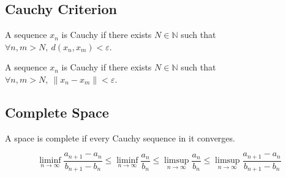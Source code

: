 \subsection{Cauchy Criterion}
\begin{definition}[metric]
	A sequence $x_n$ is Cauchy if there exists $N \in \mathbb{N}$ such that $\forall n,m > N,\ d(x_n,x_m) < \varepsilon$.
\end{definition}

\begin{definition}[norm]
	A sequence $x_n$ is Cauchy if there exists $N \in \mathbb{N}$ such that $\forall n,m >N,\ \|x_n-x_m\| < \varepsilon$.
\end{definition}

\subsection{Complete Space}
\begin{definition}[complete]
	A space is complete if every Cauchy sequence in it converges.
\end{definition}

\begin{theorem}
	\[ \liminf_{n \to \infty} \frac{a_{n+1}-a_n}{b_{n+1}-b_n} \le \liminf_{n \to \infty} \frac{a_n}{b_n} \le \limsup_{n \to \infty} \frac{a_n}{b_n} \le \limsup_{n \to \infty} \frac{a_{n+1}-a_n}{b_{n+1}-b_n} \]
\end{theorem}
